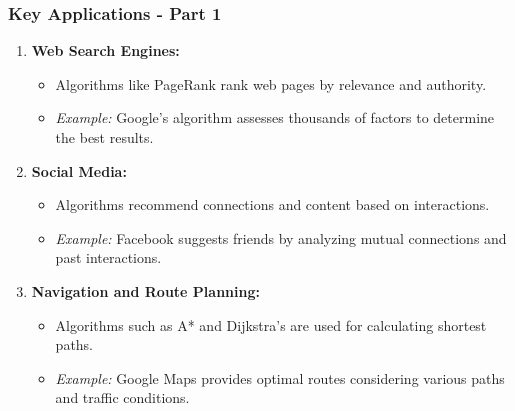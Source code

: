 \documentclass[aspectratio=169]{beamer}
\begin{document}
\begin{frame}[fragile]
    \frametitle{Key Applications - Part 1}
    \begin{enumerate}
        \item \textbf{Web Search Engines:}
        \begin{itemize}
            \item Algorithms like PageRank rank web pages by relevance and authority.
            \item \textit{Example:} Google's algorithm assesses thousands of factors to determine the best results.
        \end{itemize}

        \item \textbf{Social Media:}
        \begin{itemize}
            \item Algorithms recommend connections and content based on interactions.
            \item \textit{Example:} Facebook suggests friends by analyzing mutual connections and past interactions.
        \end{itemize}
        
        \item \textbf{Navigation and Route Planning:}
        \begin{itemize}
            \item Algorithms such as A* and Dijkstra's are used for calculating shortest paths.
            \item \textit{Example:} Google Maps provides optimal routes considering various paths and traffic conditions.
        \end{itemize}
    \end{enumerate}
\end{frame}
\end{document}
